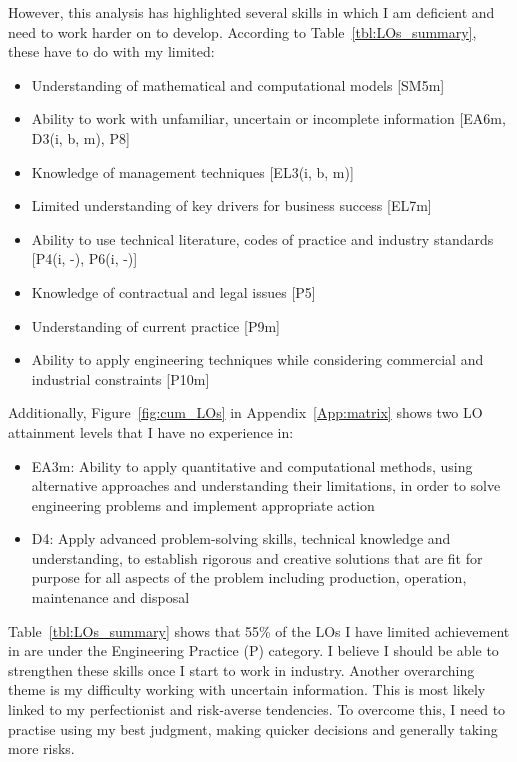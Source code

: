 However, this analysis has highlighted several skills in which I am deficient and need to work harder on to develop.
According to Table~\ref{tbl:LOs_summary}, these have to do with my limited:
\begin{itemize}
	\item Understanding of mathematical and computational models [SM5m]
	\item Ability to work with unfamiliar, uncertain or incomplete information [EA6m, D3(i, b, m), P8]
	\item Knowledge of management techniques [EL3(i, b, m)]
	\item Limited understanding of key drivers for business success [EL7m]
	\item Ability to use technical literature, codes of practice and industry standards [P4(i, -), P6(i, -)]
	\item Knowledge of contractual and legal issues [P5]
	\item Understanding of current practice [P9m]
	\item Ability to apply engineering techniques while considering commercial and industrial constraints [P10m]
\end{itemize}

Additionally, Figure~\ref{fig:cum_LOs} in Appendix~\ref{App:matrix} shows two LO attainment levels that I have no experience in:
\begin{itemize}
	\item EA3m: Ability to apply quantitative and computational methods, using alternative approaches and understanding their limitations, in order to solve engineering problems and implement appropriate action
	\item D4: Apply advanced problem-solving skills, technical knowledge and understanding, to establish rigorous and creative solutions that are fit for purpose for all aspects of the problem including production, operation, maintenance and disposal
\end{itemize}


Table~\ref{tbl:LOs_summary} shows that 55\% of the LOs I have limited achievement in are under the Engineering Practice (P) category.
I believe I should be able to strengthen these skills once I start to work in industry.
Another overarching theme is my difficulty working with uncertain information.
This is most likely linked to my perfectionist and risk-averse tendencies.
To overcome this, I need to practise using my best judgment, making quicker decisions and generally taking more risks.